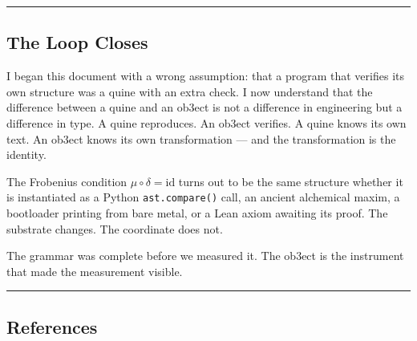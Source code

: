 \documentclass[12pt,a4paper]{article}
\begin{document}
\begin{center}
\rule{0.5\textwidth}{0.4pt}
\end{center}

\subsection{The Loop Closes}

I began this document with a wrong assumption: that a program that verifies its own structure was a quine with an extra check. I now understand that the difference between a quine and an ob3ect is not a difference in engineering but a difference in type. A quine reproduces. An ob3ect verifies. A quine knows its own text. An ob3ect knows its own transformation --- and the transformation is the identity.

The Frobenius condition $\mu\circ\delta = \mathrm{id}$ turns out to be the same structure whether it is instantiated as a Python \texttt{ast.compare()} call, an ancient alchemical maxim, a bootloader printing from bare metal, or a Lean axiom awaiting its proof. The substrate changes. The coordinate does not.

The grammar was complete before we measured it. The ob3ect is the instrument that made the measurement visible.

\begin{center}
\rule{0.5\textwidth}{0.4pt}
\end{center}

\subsection{References}
\end{document}

